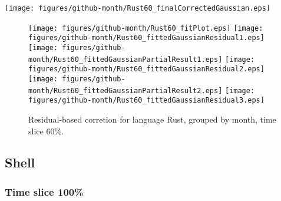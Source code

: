 \begin{center}
{\texttt{[image: figures/github-month/Rust60\_finalCorrectedGaussian.eps]}}
\end{center}

\FloatBarrier

\begin{figure}[t]
\centering
{}
{\texttt{[image: figures/github-month/Rust60\_fitPlot.eps]}}
{\texttt{[image: figures/github-month/Rust60\_fittedGaussianResidual1.eps]}}
{\texttt{[image: figures/github-month/Rust60\_fittedGaussianPartialResult1.eps]}}
{\texttt{[image: figures/github-month/Rust60\_fittedGaussianResidual2.eps]}}
{\texttt{[image: figures/github-month/Rust60\_fittedGaussianPartialResult2.eps]}}
{\texttt{[image: figures/github-month/Rust60\_fittedGaussianResidual3.eps]}}
\caption{Residual-based corretion for language Rust, grouped by month, time slice 60\%.}
\end{figure}


\FloatBarrier


\subsection{Shell}

\subsubsection{Time slice 100\%}

